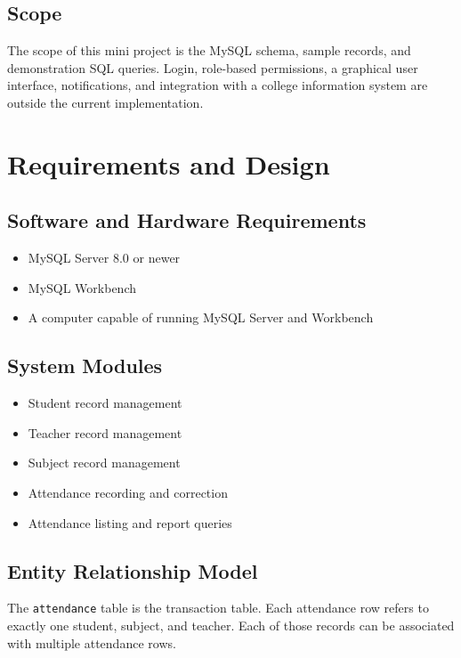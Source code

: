\documentclass[12pt,a4paper]{report}
\begin{document}
\section{Scope}
The scope of this mini project is the MySQL schema, sample records, and demonstration SQL queries. Login, role-based permissions, a graphical user interface, notifications, and integration with a college information system are outside the current implementation.

\chapter{Requirements and Design}
\section{Software and Hardware Requirements}
\begin{itemize}
    \item MySQL Server 8.0 or newer
    \item MySQL Workbench
    \item A computer capable of running MySQL Server and Workbench
\end{itemize}

\section{System Modules}
\begin{itemize}
    \item Student record management
    \item Teacher record management
    \item Subject record management
    \item Attendance recording and correction
    \item Attendance listing and report queries
\end{itemize}

\section{Entity Relationship Model}
The \texttt{attendance} table is the transaction table. Each attendance row refers to exactly one student, subject, and teacher. Each of those records can be associated with multiple attendance rows.
\end{document}
